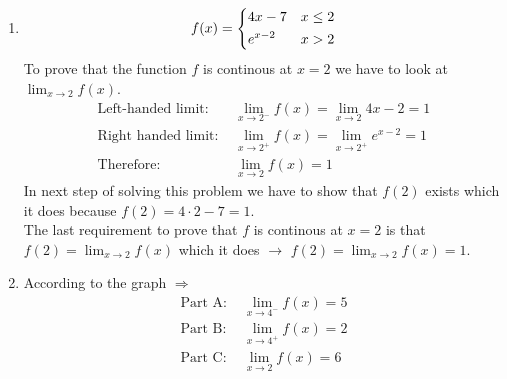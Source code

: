 \documentclass[13pt, a4paper, twoside]{article}
\begin{document}
\begin{enumerate}
    \large \onehalfspacing
    \item
    \[
        f(x)=
        \begin{dcases}
            4x-7 & x \leq 2 \\
            e^{x-2} & x > 2
        \end{dcases}
    \]
    To prove that the function $f$ is continous at $x=2$ we have
    to look at $\lim_{x\to 2}f(x)$.
    \begin{align*}
        \text{Left-handed limit: }&\lim_{x\to 2^-}f(x) = \lim_{x\to 2}4x-2 = 1\\
        \text{Right handed limit: }&\lim_{x\to 2^+}f(x) = \lim_{x\to 2^+}e^{x-2}  = 1\\
        \text{Therefore: } &\lim_{x\to 2}f(x)=1
    \end{align*}
    In next step of solving this problem we have to show that
    $f(2)$ exists which it does because $f(2)=4\cdot 2 - 7=1$.
    \\The last requirement to prove that $f$ is continous at $x=2$ is
    that $f(2)=\lim_{x\to 2}f(x)$ which it does $\to$ $f(2)=\lim_{x\to 2}f(x)=1$.
    
    \item According to the graph $\Rightarrow$
    \begin{align*}
        \text{Part A: } &\lim_{x\to 4^-}f(x) = 5\\
        \text{Part B: } &\lim_{x\to 4^+}f(x) = 2\\
        \text{Part C: } &\lim_{x\to 2}f(x) = 6
    \end{align*}


\end{enumerate}
\end{document}
